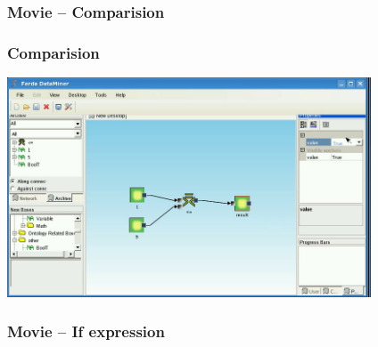 \documentclass{beamer}
\begin{document}
\begin{frame}
	\frametitle{Movie -- Comparision}
\end{frame}

\begin{frame}
	\frametitle{Comparision}
	\includegraphics[width=10.8cm]{compare2.png}
\end{frame}

\begin{frame}
	\frametitle{Movie -- If expression}
\end{frame}
\end{document}
